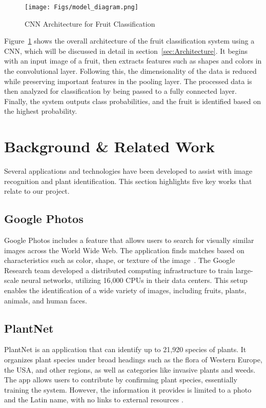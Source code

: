 \documentclass{article} %
\begin{document}
\begin{figure}[htbp]
\begin{center}
\texttt{[image: Figs/model\_diagram.png]}
\end{center}
\caption{CNN Architecture for Fruit Classification}
\label{figure1}
\end{figure}

Figure~\ref{figure1} shows the overall architecture of the fruit classification system using a CNN, which will be discussed in detail in section~\ref{sec:Architecture}. It begins with an input image of a fruit, then extracts features such as shapes and colors in the convolutional layer. Following this, the dimensionality of the data is reduced while preserving important features in the pooling layer. The processed data is then analyzed for classification by being passed to a fully connected layer. Finally, the system outputs class probabilities, and the fruit is identified based on the highest probability.

\section{Background \& Related Work}
\label{headings}

Several applications and technologies have been developed to 
assist with image recognition and plant identification. This
 section highlights five key works that relate to our project.


\subsection{Google Photos}

Google Photos includes a feature that allows users to search for 
visually similar images across the World Wide Web. The application 
finds matches based on characteristics such as color, shape, or 
texture of the image~\citep{nieuwenhuysen2018information}. The 
Google Research team developed a distributed computing infrastructure to train large-scale neural 
networks, utilizing 16,000 CPUs in their data centers. This setup 
enables the identification of a wide variety of images, including
 fruits, plants, animals, and human faces\citep{lee2020algorithmic}.

\subsection{PlantNet}

PlantNet is an application that can identify up to 21,920 species
 of plants. It organizes plant species under broad headings such as
  the flora of Western Europe, the USA, and other regions, as well 
  as categories like invasive plants and weeds. The app allows users
   to contribute by confirming plant species, essentially training 
   the system. However, the information it provides is limited to a
    photo and the Latin name, with no links to external resources 
    \citep{bilyk2020assessment}.
\end{document}
